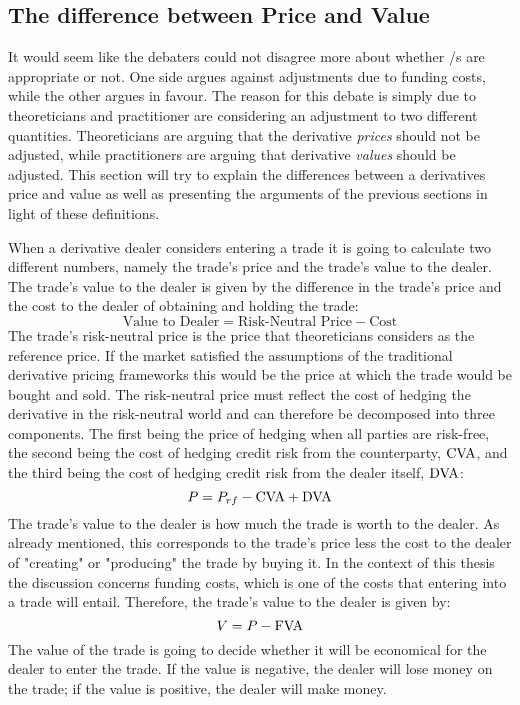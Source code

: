 \documentclass[main.tex]{subfiles}
\begin{document}
    \subsection{The difference between Price and Value}

    It would seem like the debaters could not disagree more 
    about whether \FVA/s are appropriate or not.
    One side argues against adjustments due to funding costs, while the other argues in favour.
    The reason for this debate is simply due to theoreticians and practitioner
    are considering an adjustment to two different quantities.
    Theoreticians are arguing that the derivative \textit{prices} should not be adjusted,
    while practitioners are arguing that derivative \textit{values} should be adjusted.
    This section will try to explain the differences between a derivatives price and value
    as well as presenting the arguments of the previous sections in light of these definitions.

    When a derivative dealer considers entering a trade it is going to calculate
    two different numbers, namely the trade's price and the trade's value to the dealer.
    The trade's value to the dealer is given by the difference in the trade's price
    and the cost to the dealer of obtaining and holding the trade:
        \begin{equation}
            \text{Value to Dealer} 
            =
            \text{Risk-Neutral Price}
            -
            \text{Cost}
        \end{equation}
    The trade's risk-neutral price is the price that theoreticians considers as the reference price.
    If the market satisfied the assumptions of the traditional derivative pricing frameworks
    this would be the price at which the trade would be bought and sold. 
    The risk-neutral price must reflect the cost of hedging the derivative in the risk-neutral world
    and can therefore be decomposed into three components. 
    The first being the price of hedging when all parties are risk-free, 
    the second being the cost of hedging credit risk from the counterparty, $\CVA/$,
    and the third being the cost of hedging credit risk from the dealer itself, $\DVA/$:
        \begin{equation}
            P = 
            P_{rf} 
            -
            \CVA/
            +
            \DVA/
        \end{equation}
    The trade's value to the dealer is how much the trade is worth to the dealer.
    As already mentioned, this corresponds to the trade's price less the cost to the dealer
    of "creating" or "producing" the trade by buying it.
    In the context of this thesis the discussion concerns funding costs,
    which is one of the costs that entering into a trade will entail.
    Therefore, the trade's value to the dealer is given by:
        \begin{equation}
            V = P - \FVA/
        \end{equation}
    The value of the trade is going to decide whether it will be economical 
    for the dealer to enter the trade. 
    If the value is negative, the dealer will lose money on the trade;
    if the value is positive, the dealer will make money.
    
\end{document}
